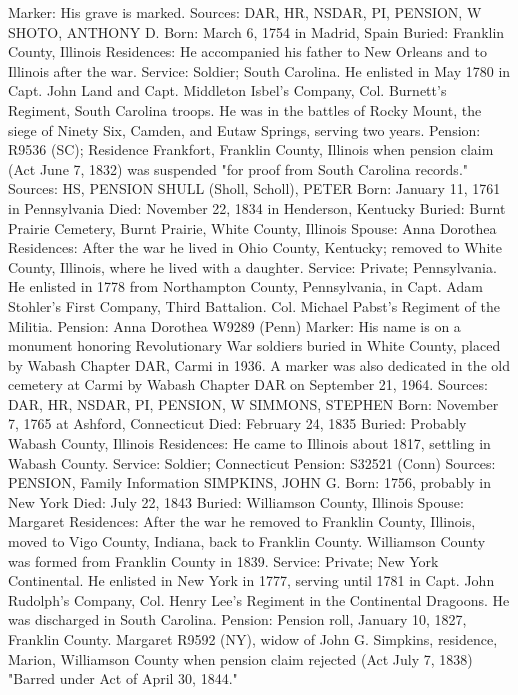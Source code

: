 Marker: His grave is marked.
Sources: DAR, HR, NSDAR, PI, PENSION, W 
SHOTO, ANTHONY D.
Born: March 6, 1754 in Madrid, Spain
Buried: Franklin County, Illinois 
Residences: He accompanied his father to New Orleans and to Illinois after the war. 
Service: Soldier; South Carolina. He enlisted in May 1780 in Capt. John Land and Capt. Middleton Isbel's Company, Col. Burnett's Regiment, South Carolina troops. He was in the battles of Rocky Mount, the siege of Ninety­ Six, Camden, and Eutaw Springs, serving two years. 
Pension: R9536 (SC); Residence Frankfort, Franklin County, Illinois when pen­sion claim (Act June 7, 1832) was suspended "for proof from South Carolina records." 
Sources: HS, PENSION 
SHULL (Sholl, Scholl), PETER 
Born: January 11, 1761 in Pennsylvania 
Died: November 22, 1834 in Henderson, Kentucky 
Buried: Burnt Prairie Cemetery, Burnt Prairie, White County, Illinois 
Spouse: Anna Dorothea 
Residences: After the war he lived in Ohio County, Kentucky; removed to White County, Illinois, where he lived with a daughter.
Service: Private; Pennsylvania. He enlisted in 1778 from Northampton County, Pennsylvania, in Capt. Adam Stohler's First Company, Third Battalion.
Col. Michael Pabst's Regiment of the Militia.
Pension: Anna Dorothea W9289 (Penn)
Marker:  His name is on a monument honoring Revolutionary War soldiers buried in White County, placed by Wabash Chapter DAR, Carmi in 1936. A marker was also dedicated in the old cemetery at Carmi by Wabash Chapter DAR on September 21, 1964. 
Sources: DAR, HR, NSDAR, PI, PENSION, W 
SIMMONS, STEPHEN
Born:  November 7, 1765 at Ashford, Connecticut
Died:   February 24, 1835
Buried:  Probably Wabash County, Illinois Residences: He came to Illinois about 1817, settling in Wabash County.
Service:  Soldier; Connecticut
Pension: S32521 (Conn)
Sources: PENSION, Family Information 
SIMPKINS, JOHN G.
Born:  1756, probably in New York
Died:   July 22, 1843 
Buried: Williamson County, Illinois 
Spouse: Margaret 
Residences: After the war he removed to Franklin County, Illinois, moved to Vigo County, Indiana, back to Franklin County. Williamson County was formed from Franklin County in 1839. 
Service: Private; New York Continental. He enlisted in New York in 1777, serv­ing until 1781 in Capt. John Rudolph's Company, Col. Henry Lee's Regiment in the Continental Dragoons. He was discharged in South Carolina. 
Pension: Pension roll, January 10, 1827, Franklin County. Margaret R9592 (NY), widow of John G. Simpkins, residence, Marion, Williamson County when pension claim rejected (Act July 7, 1838) "Barred under Act of April 30, 1844." 
